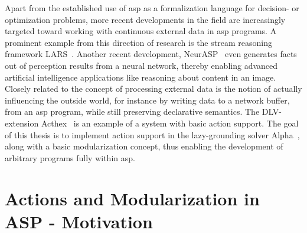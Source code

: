 Apart from the established use of \gls{asp} as a formalization language for decision- or optimization problems, more recent developments in the field are increasingly targeted toward working with continuous external data in \gls{asp} programs. A prominent example from this direction of research is the stream reasoning framework LARS~\cite{lars}. Another recent development, NeurASP~\cite{neurasp} even generates facts out of perception results from a neural network, thereby enabling advanced artificial intelligence applications like reasoning about content in an image. Closely related to the concept of processing external data is the notion of actually influencing the outside world, for instance by writing data to a network buffer, from an \gls{asp} program, while still preserving declarative semantics. The DLV-extension Acthex~\cite{acthex} is an example of a system with basic action support. The goal of this thesis is to implement action support in the lazy-grounding solver Alpha~\cite{alpha}, along with a basic modularization concept, thus enabling the development of arbitrary programs fully within \gls{asp}.

\section{Actions and Modularization in ASP - Motivation}

